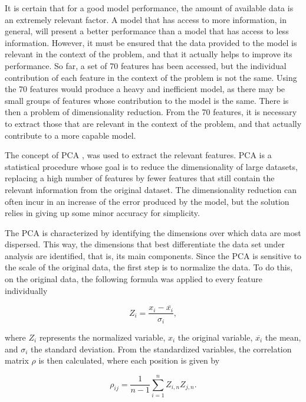 It is certain that for a good model performance, the amount of available data is an extremely relevant factor. A model that has access to more information, in general, will present a better performance than a model that has access to less information. However, it must be ensured that the data provided to the model is relevant in the context of the problem, and that it actually helps to improve its performance. So far, a set of 70 features has been accessed, but the individual contribution of each feature in the context of the problem is not the same. Using the 70 features would produce a heavy and inefficient model, as there may be small groups of features whose contribution to the model is the same. There is then a problem of dimensionality reduction. From the 70 features, it is necessary to extract those that are relevant in the context of the problem, and that actually contribute to a more capable model.

The concept of \ac{PCA} \cite{pca}, was used to extract the relevant features. \ac{PCA} is a statistical procedure whose goal is to reduce the dimensionality of large datasets, replacing a high number of features by fewer features that still contain the relevant information from the original dataset. The dimensionality reduction can often incur in an increase of the error produced by the model, but the solution relies in giving up some minor accuracy for simplicity.


The \ac{PCA} is characterized by identifying the dimensions over which data are most dispersed. This way, the dimensions that best differentiate the data set under analysis are identified, that is, its main components. Since the \ac{PCA} is sensitive to the scale of the original data, the first step is to normalize the data. To do this, on the original data, the following formula was applied to every feature individually

\begin{equation}
   Z_i = \frac{x_i-\overline{x_i}}{\sigma_i},
   \label{PCA1}
\end{equation}

where $Z_i$ represents the normalized variable, $x_i$ the original variable, $\overline{x_i}$ the mean, and $\sigma_i$ the standard deviation. From the standardized variables, the correlation matrix $\rho$ is then calculated, where each position is given by


\begin{equation}
   \rho_{ij} = \frac{1}{n-1}\sum_{i=1}^nZ_{i,n}Z_{j,n}.
   \label{PCA2}
\end{equation}


